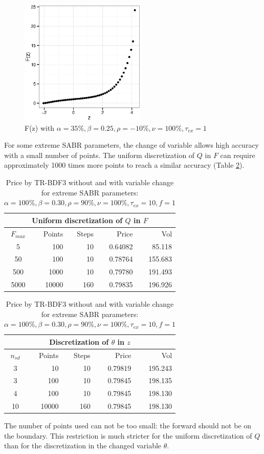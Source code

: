 \documentclass[]{rAMF2e}
\begin{document}
\begin{figure}[htb]
  \begin{center}  
    \includegraphics[width=6cm]{fz.eps}
  \end{center}
     \caption{\label{fig:Fz} F(z) with $\alpha=35\%, \beta=0.25, \rho=-10\%, \nu=100\%, \tau_{ex}=1$}
\end{figure}

For some extreme SABR parameters, the change of variable allows high accuracy with a small number of points. The uniform discretization of $Q$ in $F$ can require approximately 1000 times more points to reach a similar accuracy (Table \ref{table:discretization}).
\begin{table}[h]
\begin{center}
\begin{tabular}{|c|r|r|r|r|}
\hline
\multicolumn{5}{|c|}{Uniform discretization of $Q$ in $F$} \\ \hline
$F_{max}$ & Points & Steps & Price & Vol \\
5 & 100 & 10 & 0.64082 & 85.118  \\
50 & 100 & 10 & 0.78764 & 155.683\\
500 & 1000 & 10 & 0.79780 & 191.493 \\
5000 & 10000 & 160 & 0.79835 & 196.926\\
\hline
\end{tabular}
\begin{tabular}{|c|r|r|r|r|}
\hline
\multicolumn{5}{|c|}{Discretization of $\theta$ in $z$} \\ \hline
$n_{sd}$ & Points & Steps & Price & Vol\\
3 & 10 & 10 & 0.79819 & 195.243\\
3 & 100 & 10 & 0.79845 & 198.135\\
4 & 100 & 10 & 0.79845 & 198.130\\
10 & 10000 & 160 & 0.79845 & 198.130\\
\hline
\end{tabular}
\caption{\label{table:discretization}Price by TR-BDF3 without and with variable change for extreme SABR parameters: $\alpha=100\%, \beta=0.30, \rho=90\%, \nu=100\%, \tau_{ex}=10, f=1$}
\end{center}
\end{table} 
The number of points used can not be too small: the forward should not be on the boundary. This restriction is much stricter for the uniform discretization of $Q$ than for the discretization in the changed variable $\theta$.
\end{document}

